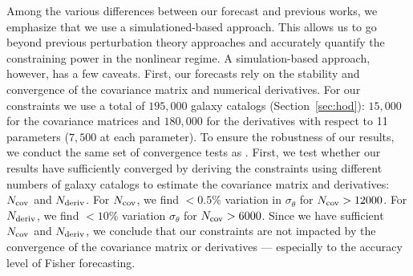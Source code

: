 Among the various differences between our forecast and previous works, we
emphasize that we use a simulationed-based approach. This allows us to go beyond previous
perturbation theory approaches and accurately quantify the constraining power
in the nonlinear regime. A simulation-based approach, however, has a few caveats. 
First, our forecasts rely on the stability and convergence of the covariance 
matrix and numerical derivatives. 
For our constraints we use a total of $195,000$ galaxy catalogs (Section~\ref{sec:hod}): 
$15,000$ for the covariance matrices and $180,000$ for the derivatives with 
respect to 11 parameters ($7,500$ at each parameter). To ensure the robustness
of our results, we conduct the same set of convergence tests as
\cite{hahn2020}. 
First, we test whether our results have sufficiently converged by deriving the 
constraints using different numbers of galaxy catalogs to estimate the covariance 
matrix and derivatives: $N_{\rm cov}$ and $N_{\rm deriv}$. For $N_{\rm cov}$,
we find $< 0.5\%$ variation in $\sigma_\theta$ for $N_{\rm cov} > 12000$.
For $N_{\rm deriv}$, 
we find $< 10\%$ variation $\sigma_\theta$ for $N_{\rm cov} > 6000$.
Since we have sufficient $N_{\rm cov}$ and $N_{\rm deriv}$, we conclude that 
our constraints are not impacted by the convergence of the covariance matrix 
or derivatives --- especially to the accuracy level of Fisher forecasting. 

